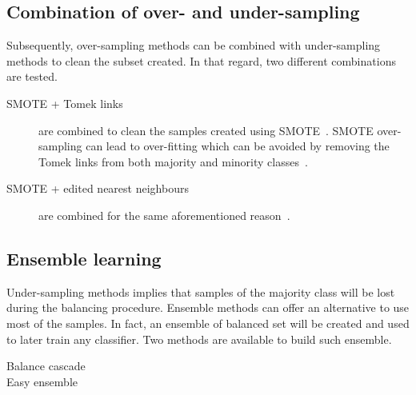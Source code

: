 \documentclass[twoside,11pt]{article}
\begin{document}
\subsection{Combination of over- and under-sampling}

Subsequently, over-sampling methods can be combined with under-sampling methods to clean the subset created.
In that regard, two different combinations are tested.

\begin{description}
  \item[SMOTE + Tomek links] are combined to clean the samples created using SMOTE~\cite{batista2003balancing}.
SMOTE over-sampling can lead to over-fitting which can be avoided by removing the Tomek links from both majority and minority classes~\cite{prati2009data}.
  \item[SMOTE + edited nearest neighbours] are combined for the same aforementioned reason~\cite{batista2004study}.
\end{description}

\subsection{Ensemble learning}

Under-sampling methods implies that samples of the majority class will be lost during the balancing procedure.
Ensemble methods can offer an alternative to use most of the samples.
In fact, an ensemble of balanced set will be created and used to later train any classifier.
Two methods are available to build such ensemble.

\begin{description}
  \item[Balance cascade]
  \item[Easy ensemble]
\end{description}
\end{document}
